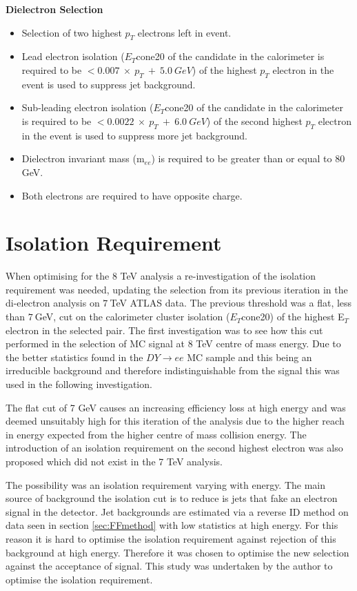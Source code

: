 {\bf Dielectron Selection}
\begin{itemize}
\item Selection of two highest $p_{T}$ electrons left in event.
\item Lead electron isolation ($E_{T}$cone20 of the candidate in the calorimeter is required to be $< 0.007~\times~p_{T}~+~5.0~GeV$) of the highest $p_{T}$ electron in the event is used to suppress jet background. 
\item Sub-leading electron isolation ($E_{T}$cone20 of the candidate in the calorimeter is required to be $< 0.0022~\times~p_{T}~+~6.0~GeV$) of the second highest $p_{T}$ electron in the event is used to suppress more jet background. 
\item Dielectron invariant mass (m$_{ee}$) is required to be greater than or equal to 80 GeV.
\item Both electrons are required to have opposite charge.
\end{itemize}




\section{Isolation Requirement}
   \label{sec:iso}

When optimising for the 8 TeV analysis a re-investigation of the isolation requirement was needed, updating the selection from its previous iteration in the di-electron analysis on $7~$TeV ATLAS data. The previous threshold was a flat, less than $7~$GeV, cut on the calorimeter cluster isolation ($E_{T}$cone20) of the highest E$_{T}$ electron in the selected pair. The first investigation was to see how this cut performed in the selection of MC signal at 8 TeV centre of mass energy. Due to the better statistics found in the $DY{\rightarrow}ee$ MC sample and this being an irreducible background and therefore indistinguishable from the signal this was used in the following investigation.

The flat cut of 7 GeV causes an increasing efficiency loss at high energy and was deemed unsuitably high for this iteration of the analysis due to the higher reach in energy expected from the higher centre of mass collision energy. The introduction of an isolation requirement on the second highest electron was also proposed which did not exist in the 7 TeV analysis.

The possibility was an isolation requirement varying with energy. The main source of background the isolation cut is to reduce is jets that fake an electron signal in the detector. Jet backgrounds are estimated via a reverse ID method on data seen in section \ref{sec:FFmethod} with low statistics at high energy. For this reason it is hard to optimise the isolation requirement against rejection of this background at high energy. Therefore it was chosen to optimise the new selection against the acceptance of signal. This study was undertaken by the author to optimise the isolation requirement. 

